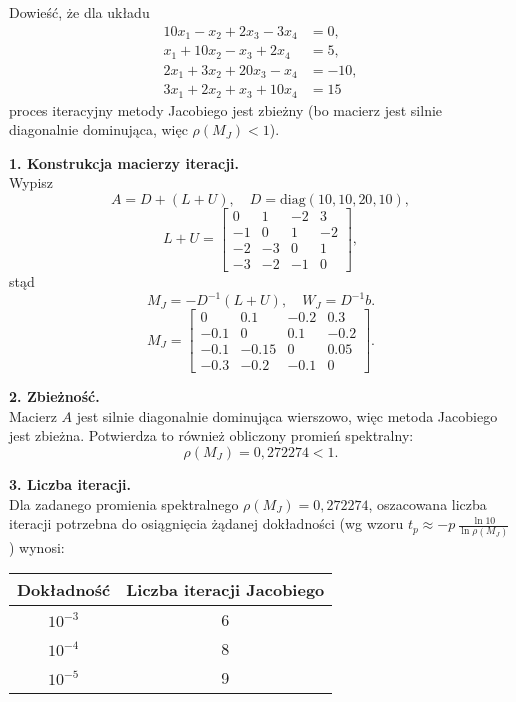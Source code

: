 \documentclass[a4paper,12pt]{article}
\begin{document}
Dowieść, że dla układu
\[
\begin{aligned}
10x_1 - x_2 + 2x_3 - 3x_4 &= 0,\\
x_1 + 10x_2 - x_3 + 2x_4 &= 5,\\
2x_1 + 3x_2 + 20x_3 - x_4 &= -10,\\
3x_1 + 2x_2 + x_3 + 10x_4 &= 15
\end{aligned}
\]
proces iteracyjny metody Jacobiego jest zbieżny (bo macierz jest silnie diagonalnie dominująca, więc \(\rho(M_J)<1\)). 

\medskip

\textbf{1. Konstrukcja macierzy iteracji.}\\
Wypisz
\[
A = D + (L+U),
\quad
D = \mathrm{diag}(10,10,20,10),
\]
\[
L+U = 
\begin{bmatrix}
0   & 1  & -2 & 3  \\
-1  & 0  & 1  & -2 \\
-2  & -3 & 0  & 1  \\
-3  & -2 & -1 & 0
\end{bmatrix},
\]
stąd
\[
M_J = -D^{-1}(L+U), 
\quad
W_J = D^{-1}b.
\]
\[
M_J = 
\begin{bmatrix}
0     & 0.1   & -0.2  & 0.3 \\
-0.1  & 0     & 0.1   & -0.2 \\
-0.1  & -0.15 & 0     & 0.05 \\
-0.3  & -0.2  & -0.1  & 0
\end{bmatrix}.
\]

\medskip

\textbf{2. Zbieżność.}\\
Macierz \(A\) jest silnie diagonalnie dominująca wierszowo, więc metoda Jacobiego jest zbieżna. Potwierdza to również obliczony promień spektralny:
\[
\rho(M_J) = 0{,}272274 < 1.
\]

\medskip

\textbf{3. Liczba iteracji.}\\
Dla zadanego promienia spektralnego \(\rho(M_J) = 0{,}272274\), oszacowana liczba iteracji potrzebna do osiągnięcia żądanej dokładności (wg wzoru \(t_p \approx -p\,\frac{\ln 10}{\ln \rho(M_J)}\)) wynosi:

\begin{center}
\begin{tabular}{cc}
\toprule
Dokładność & Liczba iteracji Jacobiego \\
\midrule
$10^{-3}$ & 6 \\
$10^{-4}$ & 8 \\
$10^{-5}$ & 9 \\
\bottomrule
\end{tabular}
\end{center}
\end{document}
